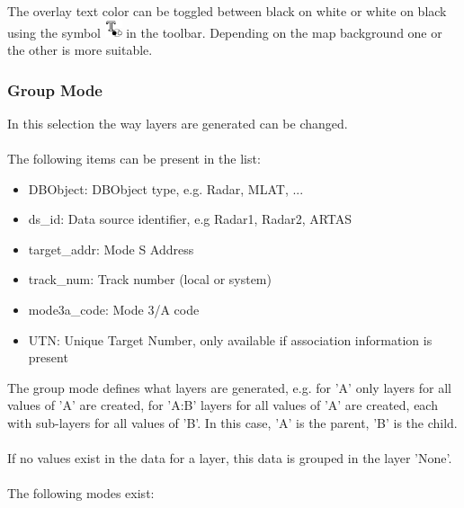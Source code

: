 {The overlay text color can be toggled between black on white or white on black using the symbol \includegraphics[width=0.5cm]{../../data/icons/text_invert.png} in the toolbar. Depending on the map background one or the other is more suitable.

\subsubsection{Group Mode}
\label{sec:group_mode}

In this selection the way layers are generated can be changed. \\\\

The following items can be present in the list:

\begin{itemize}
 \item DBObject: DBObject type, e.g. Radar, MLAT, ...
 \item ds\_id: Data source identifier, e.g Radar1, Radar2, ARTAS
 \item target\_addr: Mode S Address
 \item track\_num: Track number (local or system)
 \item mode3a\_code: Mode 3/A code
 \item UTN: Unique Target Number, only available if association information is present
\end{itemize}

The group mode defines what layers are generated, e.g. for 'A' only layers for all values of 'A' are created, for 'A:B' layers for all values of 'A' are created, each with sub-layers for all values of 'B'. In this case, 'A' is the parent, 'B' is the child. \\\\

If no values exist in the data for a layer, this data is grouped in the layer 'None'.\\\\

The following modes exist: \\

}
